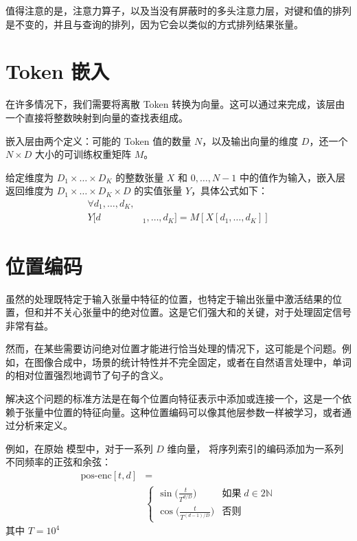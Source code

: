 值得注意的是，注意力算子，以及当没有屏蔽时的多头注意力层，对键和值的排列是不变的，并且与查询的排列，因为它会以类似的方式排列结果张量。

\section{Token 嵌入}\label{sec4.9}

在许多情况下，我们需要将离散 Token 转换为向量。这可以通过来完成，该层由一个直接将整数映射到向量的查找表组成。

嵌入层由两个定义：可能的 Token 值的数量 $N$，以及输出向量的维度 $D$，还一个 $N \times D$ 大小的可训练权重矩阵 $M$。

给定维度为 $D_1 \times \dots \times D_K$ 的整数张量 $X$ 和 ${0, \dots ,N -1}$ 中的值作为输入，嵌入层返回维度为 $D_1 \times \dots \times D_K \times D$ 的实值张量 $Y$，具体公式如下：
\begin{align*}
    \forall d_1, \dots, d_K,& \\
    Y[d&_1, \dots, d_K] = M[X[d_1, \dots, d_K]]
\end{align*}

\section{位置编码}\label{sec4.10}

虽然的处理既特定于输入张量中特征的位置，也特定于输出张量中激活结果的位置，但和并不关心张量中的绝对位置。这是它们强大和的关键，对于处理固定信号非常有益。

然而，在某些需要访问绝对位置才能进行恰当处理的情况下，这可能是个问题。例如，在图像合成中，场景的统计特性并不完全固定，或者在自然语言处理中，单词的相对位置强烈地调节了句子的含义。

解决这个问题的标准方法是在每个位置向特征表示中添加或连接一个，这是一个依赖于张量中位置的特征向量。这种位置编码可以像其他层参数一样被学习，或者通过分析来定义。

例如，在原始  模型中，对于一系列 $D$ 维向量，\cite{arxiv-1706.03762} 将序列索引的编码添加为一系列不同频率的正弦和余弦：
\begin{align*}
    \text{pos-enc}[t,d] &= \\
    &\begin{cases}
        \sin\Big(\frac{t}{T^{d/D}}\Big) &\text{如果}\; d \in 2\mathbb{N}\\
        \cos\Big(\frac{t}{T^{(d-1)/D}}\Big) &\text{否则}
    \end{cases}
\end{align*}
其中 $T= 10^4$